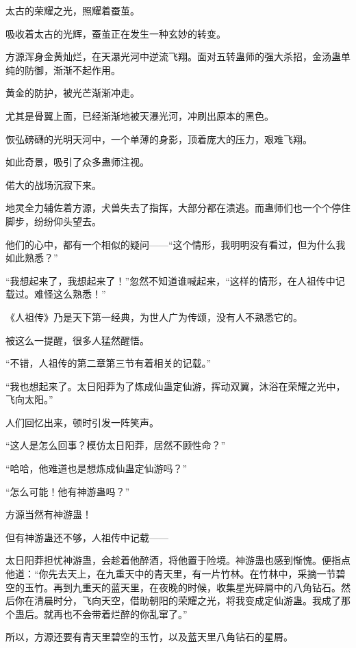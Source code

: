 
\begin{this_body}

太古的荣耀之光，照耀着蚕茧。

吸收着太古的光辉，蚕茧正在发生一种玄妙的转变。

方源浑身金黄灿烂，在天瀑光河中逆流飞翔。面对五转蛊师的强大杀招，金汤蛊单纯的防御，渐渐不起作用。

黄金的防护，被光芒渐渐冲走。

尤其是骨翼上面，已经渐渐地被天瀑光河，冲刷出原本的黑色。

恢弘磅礴的光明天河中，一个单薄的身影，顶着庞大的压力，艰难飞翔。

如此奇景，吸引了众多蛊师注视。

偌大的战场沉寂下来。

地灵全力辅佐着方源，犬兽失去了指挥，大部分都在溃逃。而蛊师们也一个个停住脚步，纷纷仰头望去。

他们的心中，都有一个相似的疑问——“这个情形，我明明没有看过，但为什么我如此熟悉？”

“我想起来了，我想起来了！”忽然不知道谁喊起来，“这样的情形，在人祖传中记载过。难怪这么熟悉！”

《人祖传》乃是天下第一经典，为世人广为传颂，没有人不熟悉它的。

被这么一提醒，很多人猛然醒悟。

“不错，人祖传的第二章第三节有着相关的记载。”

“我也想起来了。太日阳莽为了炼成仙蛊定仙游，挥动双翼，沐浴在荣耀之光中，飞向太阳。”

人们回忆出来，顿时引发一阵笑声。

“这人是怎么回事？模仿太日阳莽，居然不顾性命？”

“哈哈，他难道也是想炼成仙蛊定仙游吗？”

“怎么可能！他有神游蛊吗？”

方源当然有神游蛊！

但有神游蛊还不够，人祖传中记载——

太日阳莽担忧神游蛊，会趁着他醉酒，将他置于险境。神游蛊也感到惭愧。便指点他道：“你先去天上，在九重天中的青天里，有一片竹林。在竹林中，采摘一节碧空的玉竹。再到九重天的蓝天里，在夜晚的时候，收集星光碎屑中的八角钻石。然后你在清晨时分，飞向天空，借助朝阳的荣耀之光，将我变成定仙游蛊。我成了那个蛊后。就再也不会带着烂醉的你乱窜了。”

所以，方源还要有青天里碧空的玉竹，以及蓝天里八角钻石的星屑。


\end{this_body}
